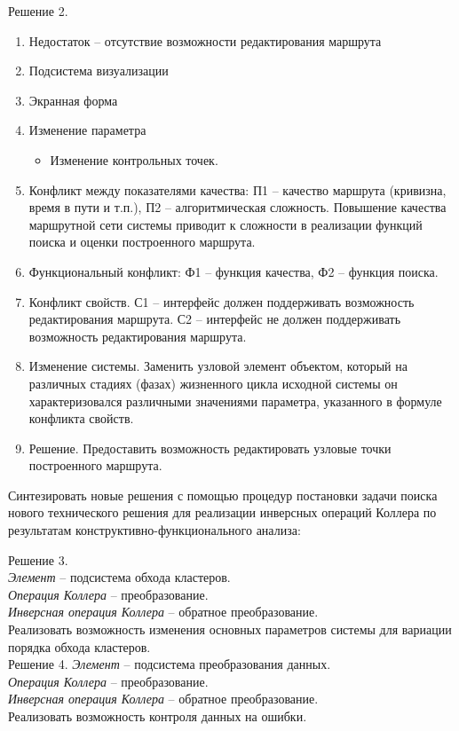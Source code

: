 Решение 2.
\begin{enumerate}
    \item Недостаток -- отсутствие возможности редактирования маршрута
    \item Подсистема визуализации
    \item Экранная форма
    \item Изменение параметра
    \begin{itemize}
        \item Изменение контрольных точек.
    \end{itemize}
    \item Конфликт между показателями качества: П1 -- качество маршрута (кривизна, время в пути и т.п.), 
        П2 -- алгоритмическая сложность. Повышение качества маршрутной сети системы приводит к сложности 
        в реализации функций поиска и оценки построенного маршрута.
    \item Функциональный конфликт: Ф1 -- функция качества, Ф2 -- 
        функция поиска.
    \item Конфликт свойств. С1 -- интерфейс должен поддерживать возможность редактирования маршрута. 
        С2 -- интерфейс не должен поддерживать возможность редактирования маршрута.
    \item Изменение системы. Заменить узловой элемент объектом, который на различных стадиях (фазах) 
        жизненного цикла исходной системы он характеризовался различными значениями параметра, 
        указанного в формуле конфликта свойств.
    \item Решение. Предоставить возможность редактировать узловые точки построенного маршрута.
\end{enumerate}

\pagebreak

Синтезировать новые решения с помощью процедур постановки задачи поиска нового технического решения 
для реализации инверсных операций Коллера по результатам конструктивно-функционального анализа:

Решение 3.\\
\emph{Элемент} -- подсистема обхода кластеров.\\
\emph{Операция Коллера} -- преобразование.\\
\emph{Инверсная операция Коллера} -- обратное преобразование.\\
Реализовать возможность изменения основных параметров системы для вариации порядка обхода кластеров.\\

Решение 4.
\emph{Элемент} -- подсистема преобразования данных.\\
\emph{Операция Коллера} -- преобразование.\\
\emph{Инверсная операция Коллера} -- обратное преобразование.\\
Реализовать возможность контроля данных на ошибки.\\

